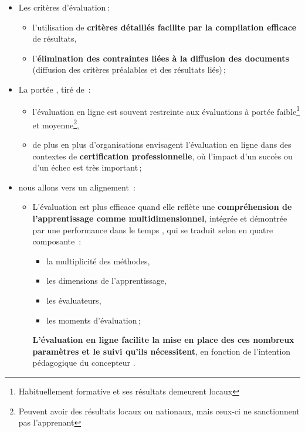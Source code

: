 \documentclass{beamer}
\begin{document}
\begin{frame}[allowframebreaks]
\begin {itemize}
\begin {itemize}
\begin {itemize}
									\item la pondération complexe,
									\item la compilation des résultats,
									\item la discussion,
									\item la négociation,
									\item la conservation des traces\,;
								\end{itemize}
						\end{itemize}
					\framebreak
					\item Les critères d'évaluation\,:
						\begin {itemize}		
							\item l'utilisation de \textbf{critères détaillés facilite par la compilation efficace} de résultats,
							\item l'\textbf{élimination des contraintes liées à la diffusion des documents} (diffusion des critères préalables et des résultats liés)\,;
						\end{itemize}
					\item La portée \citep{jisc2007a}, tiré de \citet{audet2011a}\,:
						\begin {itemize}		
							\item  l'évaluation en ligne est souvent restreinte aux évaluations à portée faible\footnote{\tiny{Habituellement formative et ses résultats demeurent locaux}} et moyenne\footnote{\tiny{Peuvent avoir des résultats locaux ou nationaux, mais ceux-ci ne sanctionnent pas l'apprenant}},
							\item de plus en plus d'organisations envisagent l'évaluation en ligne dans des contextes de \textbf{certification professionnelle}, où l'impact d'un succès ou d'un échec est très important\,;
						\end{itemize}
					\item  nous allons vers un alignement \citep{audet2011a}\,:
						\begin {itemize}		
							\item L'évaluation est plus efficace quand elle reflète une \textbf{compréhension de l'apprentissage comme multidimensionnel}, intégrée et démontrée par une performance dans le temps \citep{audet2011a}, qui se traduit selon  en quatre composante \citep{angelo1996a}\,:
								\begin {itemize}
									\item la multiplicité des méthodes,
									\item les dimensions de l'apprentissage,
									\item les évaluateurs,
									\item les moments d'évaluation\,;
								\end{itemize}
								 \textbf{L'évaluation en ligne facilite la mise en place des ces nombreux paramètres et le suivi qu'ils nécessitent}, en fonction de l'intention pédagogique du concepteur \citep{audet2011a}.
						\end{itemize}
				\end{itemize}
			\end{frame}
			
\end{document}

